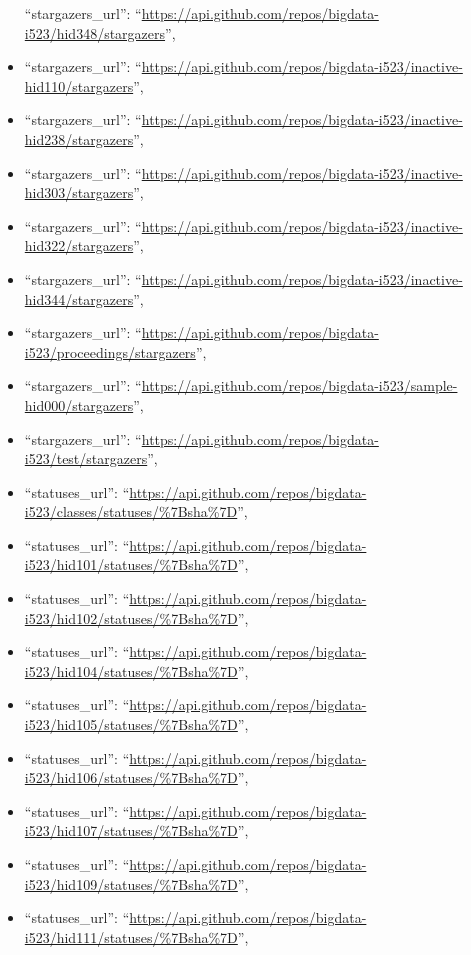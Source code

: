 \begin{itemize}
  ``stargazers\_url'':
  ``\url{https://api.github.com/repos/bigdata-i523/hid348/stargazers}'',
\item
  ``stargazers\_url'':
  ``\url{https://api.github.com/repos/bigdata-i523/inactive-hid110/stargazers}'',
\item
  ``stargazers\_url'':
  ``\url{https://api.github.com/repos/bigdata-i523/inactive-hid238/stargazers}'',
\item
  ``stargazers\_url'':
  ``\url{https://api.github.com/repos/bigdata-i523/inactive-hid303/stargazers}'',
\item
  ``stargazers\_url'':
  ``\url{https://api.github.com/repos/bigdata-i523/inactive-hid322/stargazers}'',
\item
  ``stargazers\_url'':
  ``\url{https://api.github.com/repos/bigdata-i523/inactive-hid344/stargazers}'',
\item
  ``stargazers\_url'':
  ``\url{https://api.github.com/repos/bigdata-i523/proceedings/stargazers}'',
\item
  ``stargazers\_url'':
  ``\url{https://api.github.com/repos/bigdata-i523/sample-hid000/stargazers}'',
\item
  ``stargazers\_url'':
  ``\url{https://api.github.com/repos/bigdata-i523/test/stargazers}'',
\item
  ``statuses\_url'':
  ``\url{https://api.github.com/repos/bigdata-i523/classes/statuses/\%7Bsha\%7D}'',
\item
  ``statuses\_url'':
  ``\url{https://api.github.com/repos/bigdata-i523/hid101/statuses/\%7Bsha\%7D}'',
\item
  ``statuses\_url'':
  ``\url{https://api.github.com/repos/bigdata-i523/hid102/statuses/\%7Bsha\%7D}'',
\item
  ``statuses\_url'':
  ``\url{https://api.github.com/repos/bigdata-i523/hid104/statuses/\%7Bsha\%7D}'',
\item
  ``statuses\_url'':
  ``\url{https://api.github.com/repos/bigdata-i523/hid105/statuses/\%7Bsha\%7D}'',
\item
  ``statuses\_url'':
  ``\url{https://api.github.com/repos/bigdata-i523/hid106/statuses/\%7Bsha\%7D}'',
\item
  ``statuses\_url'':
  ``\url{https://api.github.com/repos/bigdata-i523/hid107/statuses/\%7Bsha\%7D}'',
\item
  ``statuses\_url'':
  ``\url{https://api.github.com/repos/bigdata-i523/hid109/statuses/\%7Bsha\%7D}'',
\item
  ``statuses\_url'':
  ``\url{https://api.github.com/repos/bigdata-i523/hid111/statuses/\%7Bsha\%7D}'',

\end{itemize}
